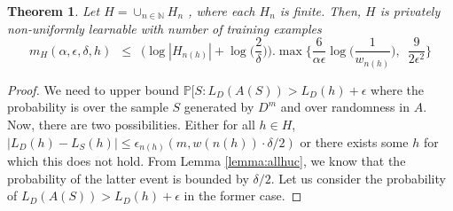\documentclass[a4paper]{article}
\newtheorem{theorem}{Theorem}[section]
\theoremstyle{definition}
\theoremstyle{remark}
\begin{document}
\begin{theorem}
Let $H = \cup_{n\in \mathbb{N}} H_n$ , where each $H_n$ is finite. Then, $H$ is privately non-uniformly learnable with number of training examples
$$m_H(\alpha, \epsilon, \delta, h) \enspace\le\enspace \bigg(\log |H_{n(h)}| + \log\Big(\frac{2}{\delta}\Big)\bigg).\max \bigg\{\frac{6}{\alpha\epsilon}\log\bigg(\frac{1}{w_{n(h)}}\bigg), \enspace\frac{9}{2\epsilon^2}\bigg\}$$
\end{theorem}

\begin{proof}
We need to upper bound $\mathbb{P}[S : L_D (A(S)) > L_D (h) + \epsilon$ where the probability is over the sample $S$ generated by $D^m$ and over randomness in $A$. Now, there are two possibilities. Either for all $h \in H$, $|L_D(h) - L_S(h)| \le \epsilon_{n(h)}(m, w(n(h))\cdot\delta/2)$ or there exists some $h$ for which this does not hold. From Lemma \ref{lemma:allhuc}, we know that the probability of the latter event is bounded by $\delta/2$. Let us consider the probability of $L_D(A(S)) > L_D(h)+\epsilon$ in the former case.


\end{proof}
\end{document}
